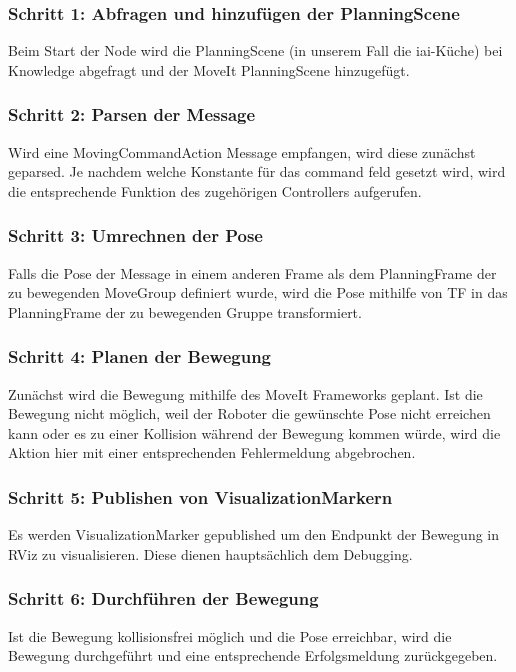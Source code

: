 \documentclass{suturo}
\begin{document}
\subsubsection*{Schritt 1: Abfragen und hinzufügen der PlanningScene}
Beim Start der Node wird die PlanningScene (in unserem Fall die iai-Küche) bei Knowledge abgefragt und der MoveIt PlanningScene hinzugefügt.

\subsubsection*{Schritt 2: Parsen der Message}
Wird eine MovingCommandAction Message empfangen, wird diese zunächst geparsed. Je nachdem welche Konstante für das command feld gesetzt wird, wird die entsprechende Funktion des zugehörigen Controllers aufgerufen.

\subsubsection*{Schritt 3: Umrechnen der Pose}
Falls die Pose der Message in einem anderen Frame als dem PlanningFrame der zu bewegenden 
MoveGroup definiert wurde, wird die Pose mithilfe von TF in das PlanningFrame der zu bewegenden Gruppe transformiert.

\subsubsection*{Schritt 4: Planen der Bewegung}
Zunächst wird die Bewegung mithilfe des MoveIt Frameworks geplant. Ist die Bewegung nicht möglich, weil der Roboter die gewünschte Pose nicht erreichen kann oder es zu einer Kollision während der Bewegung kommen würde, wird die Aktion hier mit einer entsprechenden Fehlermeldung abgebrochen.

\subsubsection*{Schritt 5: Publishen von VisualizationMarkern}
Es werden VisualizationMarker gepublished um den Endpunkt der Bewegung in RViz zu visualisieren. Diese dienen hauptsächlich dem Debugging.

\subsubsection*{Schritt 6: Durchführen der Bewegung}
Ist die Bewegung kollisionsfrei möglich und die Pose erreichbar, wird die Bewegung durchgeführt und eine entsprechende Erfolgsmeldung zurückgegeben.
\end{document}
